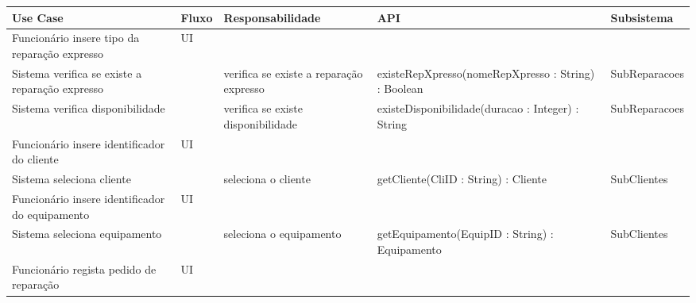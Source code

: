 \documentclass[../relatorio.tex]{subfiles}
\begin{document}
\begin{landscape}
    \begin{table}[!h]
        \centering
        \begin{tabular}{|p{5cm}|p{1cm}|p{4cm}|p{6cm}|p{3cm}|}
            \hline
            \rowcolor{gray!20!white}
            Use Case & Fluxo                                            & Responsabilidade & API & Subsistema \\
            \hline
            \rowcolor{yellow}
            Funcionário insere tipo da reparação expresso
                     & UI
                     & 
                     & 
                     & 
            \\
            \hline
            Sistema verifica se existe a reparação expresso
                     & 
                     & verifica se existe a reparação expresso
                     & existeRepXpresso(nomeRepXpresso : String) : Boolean
                     & SubReparacoes
            \\
            \hline
            Sistema verifica disponibilidade
                     & 
                     & verifica se existe disponibilidade
                     & existeDisponibilidade(duracao : Integer) : String
                     & SubReparacoes
            \\
            \hline
            \rowcolor{yellow}
            Funcionário insere identificador do cliente
                     & UI
                     & 
                     & 
                     & 
            \\
            \hline
            Sistema seleciona cliente
                     & 
                     & seleciona o cliente
                     & getCliente(CliID : String) : Cliente
                     & SubClientes
            \\
            \hline
            \rowcolor{yellow}
            Funcionário insere identificador do equipamento
                     & UI
                     & 
                     & 
                     & 
            \\
            Sistema seleciona equipamento
                     & 
                     & seleciona o equipamento
                     & getEquipamento(EquipID : String) : Equipamento
                     & SubClientes
            \\
            \hline
            \rowcolor{yellow}
            Funcionário regista pedido de reparação
                     & UI
                     & 
                     & 
                     & 

\end{tabular}
\end{table}
\end{landscape}
\end{document}
